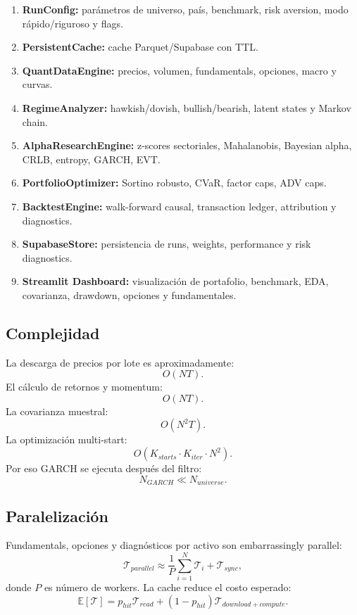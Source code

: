 \documentclass[11pt,letterpaper]{article}
\newcommand{\E}{\mathbb{E}}
\newcommand{\1}{\mathbf{1}}
\begin{document}
\begin{enumerate}
    \item \textbf{RunConfig:} parámetros de universo, país, benchmark, risk aversion, modo rápido/riguroso y flags.
    \item \textbf{PersistentCache:} cache Parquet/Supabase con TTL.
    \item \textbf{QuantDataEngine:} precios, volumen, fundamentals, opciones, macro y curvas.
    \item \textbf{RegimeAnalyzer:} hawkish/dovish, bullish/bearish, latent states y Markov chain.
    \item \textbf{AlphaResearchEngine:} z-scores sectoriales, Mahalanobis, Bayesian alpha, CRLB, entropy, GARCH, EVT.
    \item \textbf{PortfolioOptimizer:} Sortino robusto, CVaR, factor caps, ADV caps.
    \item \textbf{BacktestEngine:} walk-forward causal, transaction ledger, attribution y diagnostics.
    \item \textbf{SupabaseStore:} persistencia de runs, weights, performance y risk diagnostics.
    \item \textbf{Streamlit Dashboard:} visualización de portafolio, benchmark, EDA, covarianza, drawdown, opciones y fundamentales.
\end{enumerate}

\subsection{Complejidad}

La descarga de precios por lote es aproximadamente:
\[
    O(NT).
\]
El cálculo de retornos y momentum:
\[
    O(NT).
\]
La covarianza muestral:
\[
    O(N^2T).
\]
La optimización multi-start:
\[
    O(K_{starts}\cdot K_{iter}\cdot N^2).
\]
Por eso GARCH se ejecuta después del filtro:
\[
    N_{GARCH}\ll N_{universe}.
\]

\subsection{Paralelización}

Fundamentals, opciones y diagnósticos por activo son embarrassingly parallel:
\[
    \mathcal{T}_{parallel}
    \approx
    \frac{1}{P}
    \sum_{i=1}^{N}\mathcal{T}_i
    +
    \mathcal{T}_{sync},
\]
donde \(P\) es número de workers. La cache reduce el costo esperado:
\[
    \E[\mathcal{T}]
    =
    p_{hit}\mathcal{T}_{read}
    +
    (1-p_{hit})\mathcal{T}_{download+compute}.
\]
\end{document}
